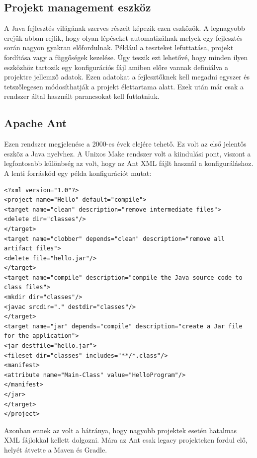 \documentclass{article}
\begin{document}
\subsection{Projekt management eszköz}\label{subsec:project_management_tool}
A Java fejlesztés világának szerves részeit képezik ezen eszközök. A legnagyobb erejük abban rejlik, hogy olyan lépéseket automatizálnak melyek egy fejlesztés során nagyon gyakran előfordulnak. Például a teszteket lefuttatása, projekt fordítása vagy a függőségek kezelése. Úgy teszik ezt lehetővé, hogy minden ilyen eszközhöz tartozik egy konfigurációs fájl amiben előre vannak definiálva a projektre jellemző adatok. Ezen adatokat a fejlesztőknek kell megadni egyszer és tetszőlegesen módosíthatják a projekt élettartama alatt. Ezek után már csak a rendszer által használt parancsokat kell futtatniuk.
\subsection{Apache Ant}\label{subsec:ant}
Ezen rendszer megjelenése a 2000-es évek elejére tehető. Ez volt az első jelentős eszköz a Java nyelvhez. A Unixos Make rendszer volt a kiindulási pont, viszont a legfontosabb különbség az volt, hogy az Ant XML fájlt használ a konfiguráláshoz. A lenti forráskód egy példa konfigurációt mutat:
\begin{lstlisting}
<?xml version="1.0"?>
<project name="Hello" default="compile">
<target name="clean" description="remove intermediate files">
<delete dir="classes"/>
</target>
<target name="clobber" depends="clean" description="remove all artifact files">
<delete file="hello.jar"/>
</target>
<target name="compile" description="compile the Java source code to class files">
<mkdir dir="classes"/>
<javac srcdir="." destdir="classes"/>
</target>
<target name="jar" depends="compile" description="create a Jar file for the application">
<jar destfile="hello.jar">
<fileset dir="classes" includes="**/*.class"/>
<manifest>
<attribute name="Main-Class" value="HelloProgram"/>
</manifest>
</jar>
</target>
</project>
\end{lstlisting}
Azonban ennek az volt a hátránya, hogy nagyobb projektek esetén hatalmas XML fájlokkal kellett dolgozni. Mára az Ant csak legacy projekteken fordul elő, helyét átvette a Maven és Gradle.
\end{document}
